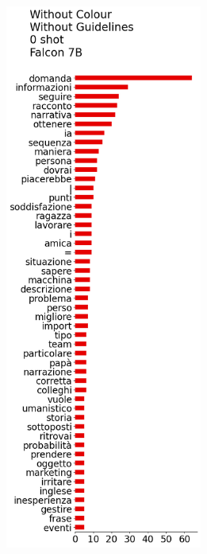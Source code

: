 \begin{figure}[!htbp]
\begin{subfigure}[t]{0.25\textwidth}
        \label{sub:persona-narrative-elicitation-comparison-distribution-human}
    \end{subfigure}
    \hspace{-1cm}
    \begin{subfigure}[t]{0.45\textwidth}
        \centering
        \captionsetup{width=.8\linewidth}%
        \includegraphics[height=18cm]{assets/imgs/tokens-vertical/token_distribution_no_color_no_guidelines_0_shot_falcon-7b.png}
        \label{sub:persona-narrative-elicitation-comparison-distribution-falcon}

\end{subfigure}
\end{figure}
